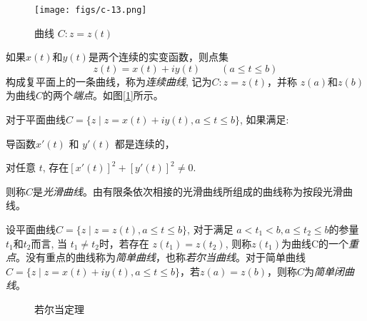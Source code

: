 \begin{figure}[htbp]
    \centering
    \texttt{[image: figs/c-13.png]}
    \caption{曲线 $ C: z = z(t)$}
    \label{fig:qxadd}
\end{figure}

\begin{definition}\label{}\index{}
	如果$x(t)$和$y(t)$是两个连续的实变函数，则点集
    \[ z(t) = x(t) + i y(t) \qquad (a\le t \le b)\]
    构成复平面上的一条曲线，称为\emph{连续曲线}, 记为$ C: z = z(t)$，并称 $z(a)$和$z(b)$为曲线$C$的两个\emph{端点}。如图[\ref{fig:qxadd}]所示。
\end{definition}

\begin{definition}\label{}
	对于平面曲线$ C = \{z \mid z=  x(t) + i y(t), a\le t \le b \}$, 如果满足:
	\begin{inparaenum}[(i)]
		\item 导函数$x'(t)$ 和 $y'(t)$ 都是连续的，
		\item 对任意 $t$, 存在$[x'(t)]^2 + [y'(t)]^2 \ne 0$.
	\end{inparaenum}
    则称$C$是\emph{光滑曲线}。由有限条依次相接的光滑曲线所组成的曲线称为按段光滑曲线。
\end{definition}

\begin{definition}\label{}
	设平面曲线$ C = \{z \mid z=  z(t), a\le t \le b \}$, 对于满足
    $a< t_1 < b, a\le t_2 \le b $的参量$t_1$和$t_2$而言, 当 $t_1 \ne t_2$时，若存在 $z(t_1) = z(t_2) $, 则称$z(t_1)$为曲线C的一个\emph{重点}。没有重点的曲线称为\emph{简单曲线}，也称\emph{若尔当曲线}。对于简单曲线$ C = \{z \mid z=  x(t) + i y(t), a\le t \le b \}$，若$z(a) = z(b) $，则称$C$为\emph{简单闭曲线}。
\end{definition}
\begin{figure}[h]
    \centering
    \caption{若尔当定理} 
    \label{fig:nrddl}
\end{figure}

